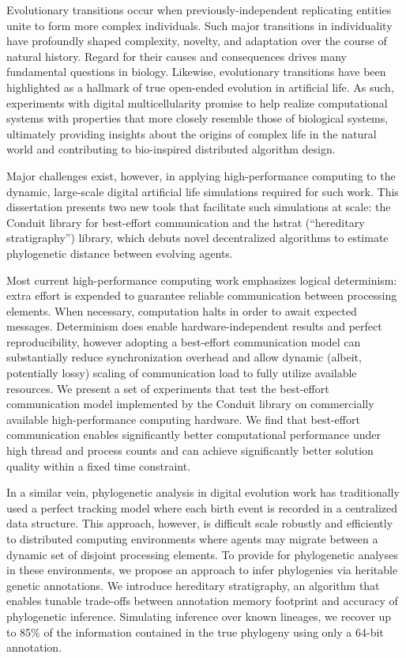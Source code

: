 Evolutionary transitions occur when previously-independent replicating entities unite to form more complex individuals.
Such major transitions in individuality have profoundly shaped complexity, novelty, and adaptation over the course of natural history.
Regard for their causes and consequences drives many fundamental questions in biology.
Likewise, evolutionary transitions have been highlighted as a hallmark of true open-ended evolution in artificial life.
As such, experiments with digital multicellularity promise to help realize computational systems with properties that more closely resemble those of biological systems, ultimately providing insights about the origins of complex life in the natural world and contributing to bio-inspired distributed algorithm design.

Major challenges exist, however, in applying high-performance computing to the dynamic, large-scale digital artificial life simulations required for such work.
This dissertation presents two new tools that facilitate such simulations at scale: the Conduit library for best-effort communication and the hstrat (``hereditary stratigraphy'') library, which debuts novel decentralized algorithms to estimate phylogenetic distance between evolving agents.

Most current high-performance computing work emphasizes logical determinism: extra effort is expended to guarantee reliable communication between processing elements.
When necessary, computation halts in order to await expected messages.
Determinism does enable hardware-independent results and perfect reproducibility, however adopting a best-effort communication model can substantially reduce synchronization overhead and allow dynamic (albeit, potentially lossy) scaling of communication load to fully utilize available resources.
We present a set of experiments that test the best-effort communication model implemented by the Conduit library on commercially available high-performance computing hardware.
We find that best-effort communication enables significantly better computational performance under high thread and process counts and can achieve significantly better solution quality within a fixed time constraint.

In a similar vein, phylogenetic analysis in digital evolution work has traditionally used a perfect tracking model where each birth event is recorded in a centralized data structure.
This approach, however, is difficult scale robustly and efficiently to distributed computing environments where agents may migrate between a dynamic set of disjoint processing elements.
To provide for phylogenetic analyses in these environments, we propose an approach to infer phylogenies via heritable genetic annotations.
We introduce hereditary stratigraphy, an algorithm that enables tunable trade-offs between annotation memory footprint and accuracy of phylogenetic inference.
Simulating inference over known lineages, we recover up to 85\% of the information contained in the true phylogeny using only a 64-bit annotation.


